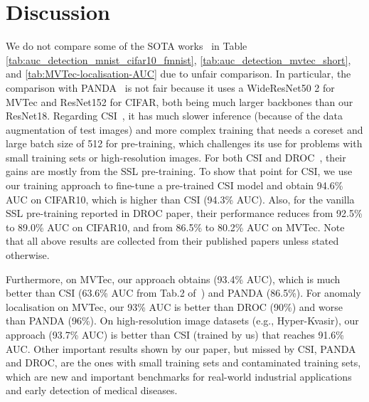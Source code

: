 \documentclass[letterpaper]{article} \usepackage{aaai22}  \usepackage{times}  \usepackage{helvet}  \usepackage{courier}  \usepackage[hyphens]{url}  \usepackage{graphicx} \urlstyle{rm} \def\UrlFont{\rm}  \usepackage{natbib}  \usepackage{caption} \DeclareCaptionStyle{ruled}{labelfont=normalfont,labelsep=colon,strut=off} \frenchspacing  \setlength{\pdfpagewidth}{8.5in}  \setlength{\pdfpageheight}{11in}  \usepackage{algorithm}
\begin{document}
\section{Discussion}
We do not compare some of the SOTA works~\cite{reiss2021panda,sohn2020learning,tack2020csi} in Table \ref{tab:auc_detection_mnist_cifar10_fmnist}, \ref{tab:auc_detection_mvtec_short}, and \ref{tab:MVTec-localisation-AUC} due to unfair comparison. 
In particular, the comparison with PANDA~\cite{reiss2021panda} is not fair because it uses a WideResNet50  2 for MVTec and ResNet152 for CIFAR, both being much larger backbones than our ResNet18. 
Regarding CSI~\cite{tack2020csi}, it has much slower inference (because of the  data augmentation of test images) and more complex training that needs a coreset and large batch size of 512 for pre-training, which challenges its use for problems with small training sets or high-resolution images.
For both CSI and DROC~\cite{sohn2020learning}, their gains are mostly from the SSL pre-training. To show that point for CSI, we use our training approach to fine-tune a pre-trained CSI model and obtain 94.6\% AUC on CIFAR10, which is higher than CSI (94.3\% AUC).
Also, for the vanilla SSL pre-training reported in DROC paper, their performance reduces from 92.5\% to 89.0\% AUC on CIFAR10, and from 86.5\% to 80.2\% AUC on MVTec. 
Note that all above results are collected from their published papers unless stated otherwise. 

Furthermore, on MVTec, our approach obtains (93.4\% AUC), which is much better than CSI (63.6\% AUC from Tab.2 of~\cite{reiss2021mean}) and PANDA (86.5\%).
For anomaly localisation on MVTec, our 93\% AUC is better than DROC (90\%) and worse than PANDA (96\%).
On high-resolution image datasets (e.g., Hyper-Kvasir), our approach (93.7\% AUC) is better than CSI (trained by us) that reaches 91.6\% AUC. 
Other important results shown by our paper, but missed by CSI, PANDA and DROC, are the ones with small training sets and contaminated training sets, which are new and important benchmarks for real-world industrial applications and early detection of medical diseases.
\end{document}
